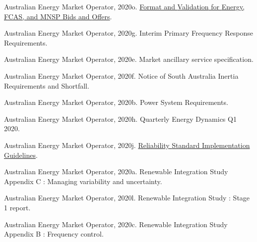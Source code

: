 \documentclass[12pt,a4paper,]{report}
\newlength{\cslhangindent}
\newenvironment{CSLReferences}[2] %
 {%
  \setlength{\parindent}{0pt}
  \ifodd #1 \everypar{\setlength{\hangindent}{\cslhangindent}}\ignorespaces\fi
  \ifnum #2 > 0
  \setlength{\parskip}{#2\baselineskip}
  \fi
 }%
 {}
\begin{document}
\begin{CSLReferences}{1}{0}
\leavevmode{}%
Australian Energy Market Operator, 2020o.
\href{https://www.aemo.com.au/-/media/Files/Electricity/NEM/5MS/Systems-Workstream/2019/Format-and-Validation-for-Energy-FCAS-and-MNSP-Bids-and-Offers.pdf}{Format
and {Validation} for {Energy}, {FCAS}, and {MNSP Bids} and {Offers}}.

\leavevmode{}%
Australian Energy Market Operator, 2020g. Interim {Primary Frequency
Response Requirements}.

\leavevmode{}%
Australian Energy Market Operator, 2020e. Market ancillary service
specification.

\leavevmode{}%
Australian Energy Market Operator, 2020f. Notice of {South Australia
Inertia Requirements} and {Shortfall}.

\leavevmode{}%
Australian Energy Market Operator, 2020b. Power {System Requirements}.

\leavevmode{}%
Australian Energy Market Operator, 2020h. Quarterly {Energy Dynamics Q1}
2020.

\leavevmode{}%
Australian Energy Market Operator, 2020j.
\href{https://aemo.com.au/-/media/files/electricity/nem/planning_and_forecasting/rsig/reliability-standard-implementation-guidelines.pdf?la=en}{Reliability
{Standard Implementation Guidelines}}.

\leavevmode{}%
Australian Energy Market Operator, 2020a. Renewable {Integration Study
Appendix C} : {Managing} variability and uncertainty.

\leavevmode{}%
Australian Energy Market Operator, 2020l. Renewable {Integration Study}
: {Stage} 1 report.

\leavevmode{}%
Australian Energy Market Operator, 2020c. Renewable {Integration Study
Appendix B} : {Frequency} control.


\end{CSLReferences}
\end{document}
